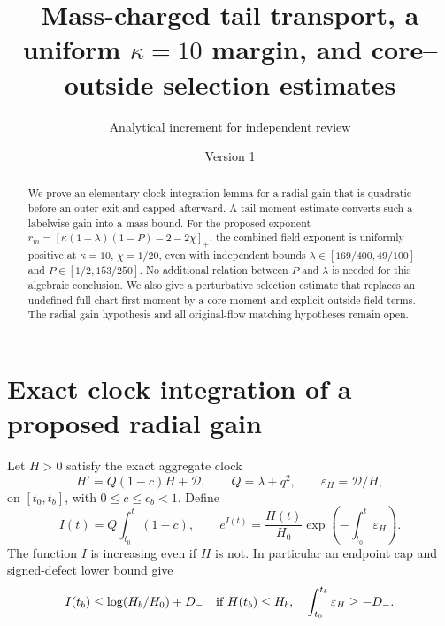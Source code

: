 \documentclass[11pt]{article}
\title{Mass-charged tail transport, a uniform $\kappa=10$ margin, and core--outside selection estimates}
\author{Analytical increment for independent review}\date{Version 1}
\theoremstyle{remark}\newtheorem{remark}[theorem]{Remark}
\begin{document}
\maketitle
\begin{abstract}
We prove an elementary clock-integration lemma for a radial gain that is quadratic before an outer exit and capped afterward. A tail-moment estimate converts such a labelwise gain into a mass bound. For the proposed exponent $r_m=[\kappa(1-\lambda)(1-P)-2-2\chi]_+$, the combined field exponent is uniformly positive at $\kappa=10$, $\chi=1/20$, even with independent bounds $\lambda\in[169/400,49/100]$ and $P\in[1/2,153/250]$. No additional relation between $P$ and $\lambda$ is needed for this algebraic conclusion. We also give a perturbative selection estimate that replaces an undefined full chart first moment by a core moment and explicit outside-field terms. The radial gain hypothesis and all original-flow matching hypotheses remain open.
\end{abstract}

\section{Exact clock integration of a proposed radial gain}
Let $H>0$ satisfy the exact aggregate clock
\[
 H'=Q(1-c)H+\mathcal D,\qquad Q=\lambda+q^2,\qquad
 \varepsilon_H=\mathcal D/H,
\]
on $[t_0,t_b]$, with $0\le c\le c_b<1$. Define
\begin{equation}\label{inc:AN03:tailrepair:v1:clock}
 I(t)=Q\int_{t_0}^t(1-c),\qquad
 e^{I(t)}=\frac{H(t)}{H_0}\exp\left(-\int_{t_0}^t\varepsilon_H\right).
\end{equation}
The function $I$ is increasing even if $H$ is not. In particular an endpoint cap and signed-defect lower bound give
\[
 I(t_b)\le\log(H_b/H_0)+D_-
 \quad\hbox{if } H(t_b)\le H_b,\quad \int_{t_0}^{t_b}\varepsilon_H\ge-D_-.
\]
\end{document}
